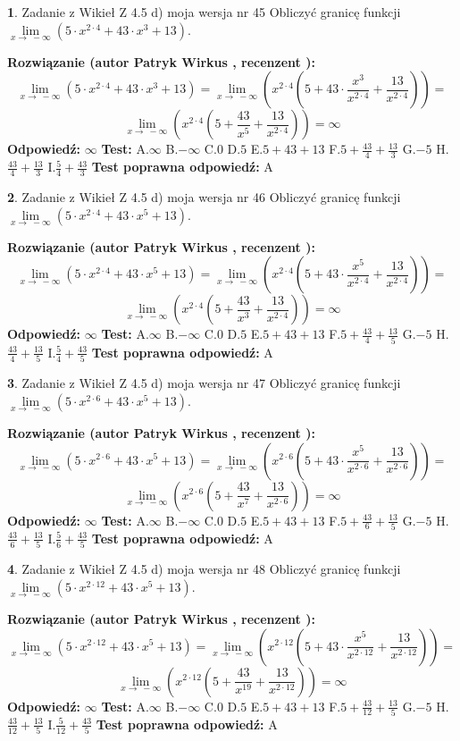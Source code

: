 \documentclass[12pt, a4paper]{article}
\theoremstyle{definition} %
\newtheorem{zad}{}
\newcommand{\zadStart}[1]{\begin{zad}#1\newline}
\newcommand{\zadStop}{\end{zad}}
\newcommand{\rozwStart}[2]{\noindent \textbf{Rozwiązanie (autor #1 , recenzent #2): }\newline}
\newcommand{\rozwStop}{\newline}
\newcommand{\odpStart}{\noindent \textbf{Odpowiedź:}\newline}
\newcommand{\odpStop}{\newline}
\newcommand{\testStart}{\noindent \textbf{Test:}\newline}
\newcommand{\testStop}{\newline}
\newcommand{\kluczStart}{\noindent \textbf{Test poprawna odpowiedź:}\newline}
\newcommand{\kluczStop}{\newline}
\begin{document}
\zadStart{Zadanie z Wikieł Z 4.5 d) moja wersja nr 45}
Obliczyć granicę funkcji  $\lim\limits_{x\to\ -\infty}(5 \cdot x^{2\cdot4}+43 \cdot x^{3}+13)$.
\zadStop
\rozwStart{Patryk Wirkus}{}
$$\lim\limits_{x\to\ -\infty}(5 \cdot x^{2\cdot4}+43 \cdot x^{3}+13) = \lim\limits_{x\to\ -\infty}(x^{2\cdot4}(5 +43 \cdot \frac{x^{3}}{x^{2\cdot4}}+\frac{13}{x^{2\cdot4}})) =$$ $$\lim\limits_{x\to\ -\infty}(x^{2\cdot4}(5 +\frac{43}{x^{5}}+\frac{13}{x^{2\cdot4}})) =\infty$$
\rozwStop
\odpStart
$\infty$
\odpStop
\testStart
A.$\infty$ B.$-\infty$ C.$0$ D.$5$ E.$5 + 43 + 13$
F.$5+\frac{43}{4}+\frac{13}{3}$ G.$-5$
H.$\frac{43}{4}+\frac{13}{3}$
I.$\frac{5}{4}+\frac{43}{3}$
\testStop
\kluczStart
A
\kluczStop



\zadStart{Zadanie z Wikieł Z 4.5 d) moja wersja nr 46}
Obliczyć granicę funkcji  $\lim\limits_{x\to\ -\infty}(5 \cdot x^{2\cdot4}+43 \cdot x^{5}+13)$.
\zadStop
\rozwStart{Patryk Wirkus}{}
$$\lim\limits_{x\to\ -\infty}(5 \cdot x^{2\cdot4}+43 \cdot x^{5}+13) = \lim\limits_{x\to\ -\infty}(x^{2\cdot4}(5 +43 \cdot \frac{x^{5}}{x^{2\cdot4}}+\frac{13}{x^{2\cdot4}})) =$$ $$\lim\limits_{x\to\ -\infty}(x^{2\cdot4}(5 +\frac{43}{x^{3}}+\frac{13}{x^{2\cdot4}})) =\infty$$
\rozwStop
\odpStart
$\infty$
\odpStop
\testStart
A.$\infty$ B.$-\infty$ C.$0$ D.$5$ E.$5 + 43 + 13$
F.$5+\frac{43}{4}+\frac{13}{5}$ G.$-5$
H.$\frac{43}{4}+\frac{13}{5}$
I.$\frac{5}{4}+\frac{43}{5}$
\testStop
\kluczStart
A
\kluczStop



\zadStart{Zadanie z Wikieł Z 4.5 d) moja wersja nr 47}
Obliczyć granicę funkcji  $\lim\limits_{x\to\ -\infty}(5 \cdot x^{2\cdot6}+43 \cdot x^{5}+13)$.
\zadStop
\rozwStart{Patryk Wirkus}{}
$$\lim\limits_{x\to\ -\infty}(5 \cdot x^{2\cdot6}+43 \cdot x^{5}+13) = \lim\limits_{x\to\ -\infty}(x^{2\cdot6}(5 +43 \cdot \frac{x^{5}}{x^{2\cdot6}}+\frac{13}{x^{2\cdot6}})) =$$ $$\lim\limits_{x\to\ -\infty}(x^{2\cdot6}(5 +\frac{43}{x^{7}}+\frac{13}{x^{2\cdot6}})) =\infty$$
\rozwStop
\odpStart
$\infty$
\odpStop
\testStart
A.$\infty$ B.$-\infty$ C.$0$ D.$5$ E.$5 + 43 + 13$
F.$5+\frac{43}{6}+\frac{13}{5}$ G.$-5$
H.$\frac{43}{6}+\frac{13}{5}$
I.$\frac{5}{6}+\frac{43}{5}$
\testStop
\kluczStart
A
\kluczStop



\zadStart{Zadanie z Wikieł Z 4.5 d) moja wersja nr 48}
Obliczyć granicę funkcji  $\lim\limits_{x\to\ -\infty}(5 \cdot x^{2\cdot12}+43 \cdot x^{5}+13)$.
\zadStop
\rozwStart{Patryk Wirkus}{}
$$\lim\limits_{x\to\ -\infty}(5 \cdot x^{2\cdot12}+43 \cdot x^{5}+13) = \lim\limits_{x\to\ -\infty}(x^{2\cdot12}(5 +43 \cdot \frac{x^{5}}{x^{2\cdot12}}+\frac{13}{x^{2\cdot12}})) =$$ $$\lim\limits_{x\to\ -\infty}(x^{2\cdot12}(5 +\frac{43}{x^{19}}+\frac{13}{x^{2\cdot12}})) =\infty$$
\rozwStop
\odpStart
$\infty$
\odpStop
\testStart
A.$\infty$ B.$-\infty$ C.$0$ D.$5$ E.$5 + 43 + 13$
F.$5+\frac{43}{12}+\frac{13}{5}$ G.$-5$
H.$\frac{43}{12}+\frac{13}{5}$
I.$\frac{5}{12}+\frac{43}{5}$
\testStop
\kluczStart
A
\kluczStop
\end{document}

